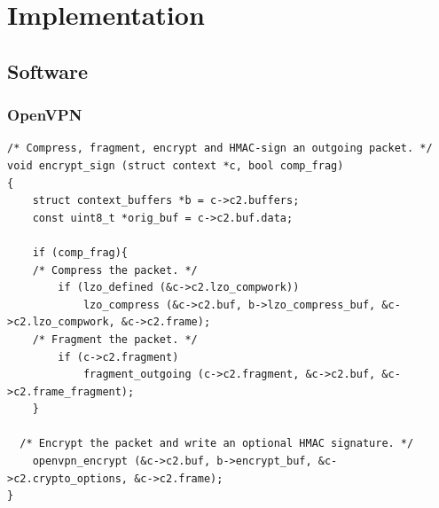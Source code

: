 \chapter{Implementation}

\section{Software}

\subsection{OpenVPN}

\lstset{language=c}
\begin{lstlisting}[caption=openvpn compress then encrypt -- sample from \texttt{forward.c}, label=list:]
/* Compress, fragment, encrypt and HMAC-sign an outgoing packet. */
void encrypt_sign (struct context *c, bool comp_frag)
{
	struct context_buffers *b = c->c2.buffers;
	const uint8_t *orig_buf = c->c2.buf.data;

	if (comp_frag){
	/* Compress the packet. */
		if (lzo_defined (&c->c2.lzo_compwork))
			lzo_compress (&c->c2.buf, b->lzo_compress_buf, &c->c2.lzo_compwork, &c->c2.frame);
	/* Fragment the packet. */
		if (c->c2.fragment)
			fragment_outgoing (c->c2.fragment, &c->c2.buf, &c->c2.frame_fragment);
	}

  /* Encrypt the packet and write an optional HMAC signature. */
	openvpn_encrypt (&c->c2.buf, b->encrypt_buf, &c->c2.crypto_options, &c->c2.frame);
}
\end{lstlisting}

